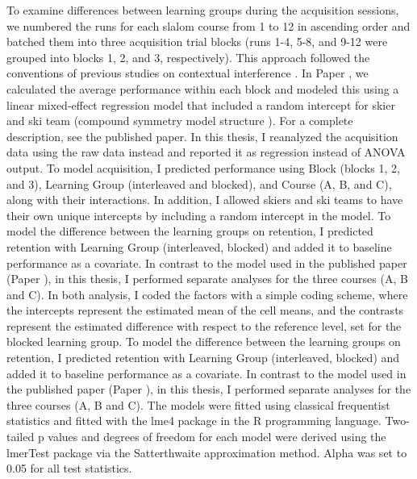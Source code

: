 To examine differences between learning groups during the acquisition sessions, we numbered the runs for each slalom course from 1 to 12 in ascending order and batched them into three acquisition trial blocks (runs 1-4, 5-8, and 9-12 were grouped into blocks 1, 2, and 3, respectively). This approach followed the conventions of previous studies on contextual interference \cite{shea_contextual_1979, lee_locus_1983}. In Paper , we calculated the average performance within each block and modeled this using a linear mixed-effect regression model that included a random intercept for skier and ski team (compound symmetry model structure ). For a complete description, see the published paper\cite{magelssen_is_2022}. In this thesis, I reanalyzed the acquisition data using the raw data instead and reported it as regression instead of ANOVA output. To model acquisition, I predicted performance using Block (blocks 1, 2, and 3), Learning Group (interleaved and blocked), and Course (A, B, and C), along with their interactions. In addition, I allowed skiers and ski teams to have their own unique intercepts by including a random intercept in the model. To model the difference between the learning groups on retention, I predicted retention with Learning Group (interleaved, blocked) and added it to baseline performance as a covariate. In contrast to the model used in the published paper (Paper ), in this thesis, I performed separate analyses for the three courses (A, B and C). In both analysis, I coded the factors with a simple coding scheme, where the intercepts represent the estimated mean of the cell means, and the contrasts represent the estimated difference with respect to the reference level, set for the blocked learning group. To model the difference between the learning groups on retention, I predicted retention with Learning Group (interleaved, blocked) and added it to baseline performance as a covariate. In contrast to the model used in the published paper (Paper ), in this thesis, I performed separate analyses for the three courses (A, B and C). The models were fitted using classical frequentist statistics and fitted with the lme4 package \cite{bates_fitting_2015} in the R \cite{r_core_team_r_2022} programming language. Two-tailed p values and degrees of freedom for each model were derived using the lmerTest package \cite{kuznetsova_lmertest_2017} via the Satterthwaite approximation method. Alpha was set to 0.05 for all test statistics.

